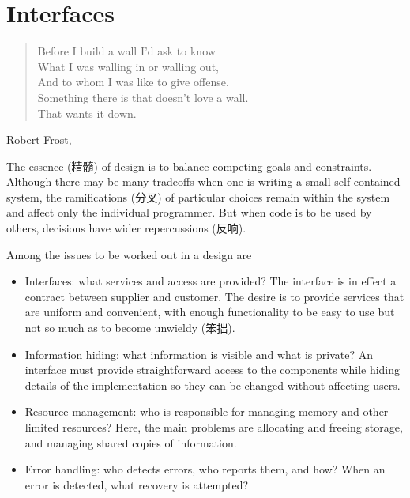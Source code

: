 \chapter{Interfaces}
\label{chap:interface}
\begin{quote}
    Before I build a wall I'd ask to know \\
    What I was walling in or walling out, \\
    And to whom I was like to give offense. \\
    Something there is that doesn't love a wall. \\
    That wants it down.
\end{quote}
\begin{quotesrc}
    Robert Frost, 
\end{quotesrc}

The essence (精髓) of design is to balance competing goals and constraints.
Although there may be many tradeoffs when one is writing a small
self-contained system, the ramifications (分叉) of particular choices
remain within the system and affect only the individual programmer. But
when code is to be used by others, decisions have wider repercussions
(反响).

Among the issues to be worked out in a design are
\begin{itemize}
    \item Interfaces: what services and access are provided? The interface
        is in effect a contract between supplier and customer. The desire
        is to provide services that are uniform and convenient, with enough
        functionality to be easy to use but not so much as to become
        unwieldy (笨拙).
    \item Information hiding: what information is visible and what is
        private? An interface must provide straightforward access to the
        components while hiding details of the implementation so they can
        be changed without affecting users.
    \item Resource management: who is responsible for managing memory and
        other limited resources? Here, the main problems are allocating and
        freeing storage, and managing shared copies of information.
    \item Error handling: who detects errors, who reports them, and how?
        When an error is detected, what recovery is attempted?
\end{itemize}

